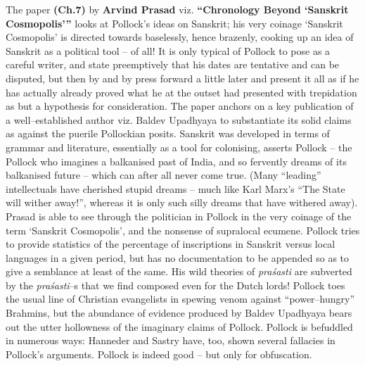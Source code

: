 The paper \textbf{(Ch.7)} by \textbf{Arvind Prasad} viz. \textbf{“Chronology Beyond ‘Sanskrit Cosmopolis’”} looks at Pollock’s ideas on Sanskrit; his very coinage ‘Sanskrit Cosmopolis’ is directed towards baselessly, hence brazenly, cooking up an idea of Sanskrit as a political tool – of all! It is only typical of Pollock to pose as a careful writer, and state preemptively that his dates are tentative and can be disputed, but then by and by press forward a little later and present it all as if he has actually already proved what he at the outset had presented with trepidation as but a hypothesis for consideration. The paper anchors on a key publication of a well–established author viz. Baldev Upadhyaya to substantiate its solid claims as against the puerile Pollockian posits. Sanskrit was developed in terms of grammar and literature, essentially as a tool for colonising, asserts Pollock – the Pollock who imagines a balkanised past of India, and so fervently dreams of its balkanised future – which can after all never come true. (Many “leading” intellectuals have cherished stupid dreams – much like Karl Marx’s “The State will wither away!”, whereas it is only such silly dreams that have withered away). Prasad is able to see through the politician in Pollock in the very coinage of the term ‘Sanskrit Cosmopolis’, and the nonsense of supralocal ecumene. Pollock tries to provide statistics of the percentage of inscriptions in Sanskrit versus local languages in a given period, but has no documentation to be appended so as to give a semblance at least of the same. His wild theories of \textit{praśasti} are subverted by the \textit{praśasti}–s that we find composed even for the Dutch lords! Pollock toes the usual line of Christian evangelists in spewing venom against “power–hungry” Brahmins, but the abundance of evidence produced by Baldev Upadhyaya bears out the utter hollowness of the imaginary claims of Pollock. Pollock is befuddled in numerous ways: Hanneder and Sastry have, too, shown several fallacies in Pollock’s arguments. Pollock is indeed good – but only for obfuscation.

